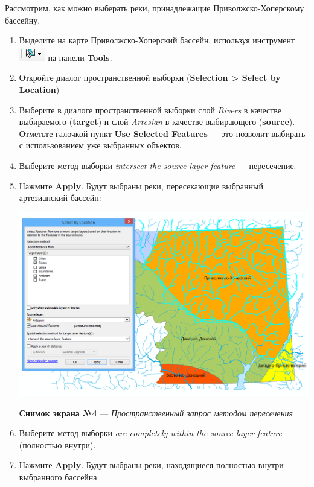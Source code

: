 \documentclass[]{book}
\theoremstyle{definition}
\theoremstyle{definition}
\theoremstyle{definition}
\theoremstyle{remark}
\begin{document}
Рассмотрим, как можно выберать реки, принадлежащие Приволжско-Хоперскому
бассейну.

\begin{enumerate}
\def\labelenumi{\arabic{enumi}.}
\item
  Выделите на карте Приволжско-Хоперский бассейн, используя инструмент
  \includegraphics{images/Ex06/image15.png} на панели \textbf{Tools}.
\item
  Откройте диалог пространственной выборки (\textbf{Selection
  \textgreater{} Select by Location})
\item
  Выберите в диалоге пространственной выборки слой \emph{Rivers} в
  качестве выбираемого (\textbf{target}) и слой \emph{Artesian} в
  качестве выбирающего (\textbf{source}). Отметьте галочкой пункт
  \textbf{Use Selected Features} --- это позволит выбирать с
  использованием уже выбранных объектов.
\item
  Выберите метод выборки \emph{intersect the source layer feature} ---
  пересечение.
\item
  Нажмите \textbf{Apply}. Будут выбраны реки, пересекающие выбранный
  артезианский бассейн:

  \includegraphics{images/Ex06/image16.png}

  \textbf{Снимок экрана №4} --- \emph{Пространственный запрос методом
  пересечения}
\item
  Выберите метод выборки \emph{are completely within the source layer
  feature} (полностью внутри).
\item
  Нажмите \textbf{Apply}. Будут выбраны реки, находящиеся полностью
  внутри выбранного бассейна:


\end{enumerate}
\end{document}
